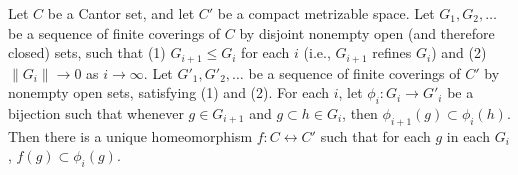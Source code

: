 Let $C$ be a Cantor set, and let $C'$ be a compact metrizable space. Let $G_1, G_2, \ldots$ be a sequence of finite coverings of $C$ by disjoint nonempty open (and therefore closed) sets, such that (1) $G_{i+1} \leqslant G_i$ for each $i$ (i.e., $G_{i+1}$ refines $G_i$) and (2) $\|G_i\| \to 0$ as $i \to \infty$. Let $G'_1, G'_2, \ldots$ be a sequence of finite coverings of $C'$ by nonempty open sets, satisfying (1) and (2). For each $i$, let $\phi_i: G_i \to G'_i$ be a bijection such that whenever $g \in G_{i+1}$ and $g \subset h \in G_i$, then $\phi_{i+1}(g) \subset \phi_i(h)$. Then there is a unique homeomorphism $f: C \leftrightarrow C'$ such that for each $g$ in each $G_i$, $f(g) \subset \phi_i(g)$.
